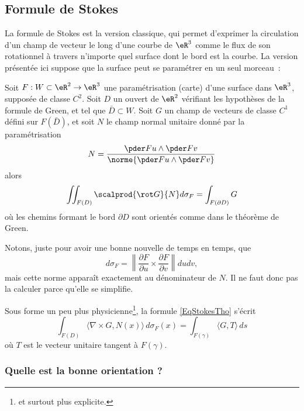 \subsection{Formule de Stokes}
\label{secstokesusuel}
La formule de Stokes est la version classique, qui permet d'exprimer la circulation d'un champ de vecteur le long d'une courbe de $\eR^3$ comme le flux de son rotationnel à travers n'importe quel surface dont le bord est la courbe. La version présentée ici suppose que la surface peut se paramétrer en un seul morceau~:
\begin{theorem}
  Soit $F : W\subset \eR^2 \to \eR^3$ une paramétrisation (carte) d'une surface dans $\eR^3$, supposée de classe $C^2$. Soit $D$ un ouvert de $\eR^2$ vérifiant les hypothèses de la formule de Green, et tel que $\bar D \subset W$. Soit $G$ un champ de vecteurs de classe $C^1$ défini sur $F(\bar D)$, et soit $N$ le champ normal unitaire donné par la paramétrisation
  \begin{equation}		
	N = \frac{\pder F u \wedge \pder F v}{\norme{\pder F u \wedge \pder F v}}
\end{equation}
  alors
  \begin{equation}\label{EqStokesTho}
    \iint_{F(D)} \scalprod{\rot G}{N} d\sigma_F = \int_{F(\partial D)} G
  \end{equation}
  où les chemins formant le bord $\partial D$ sont orientés comme dans le théorème de Green.
\end{theorem}
Notons, juste pour avoir une bonne nouvelle de temps en temps, que 
\begin{equation}
	d\sigma_F=\left\| \frac{ \partial F }{ \partial u }\times\frac{ \partial F }{ \partial v }  \right\|dudv,
\end{equation}
mais cette norme apparaît exactement au dénominateur de $N$. Il ne faut donc pas la calculer parce qu'elle se simplifie.

Sous forme un peu plus physicienne\footnote{et surtout plus explicite.}, la formule \eqref{EqStokesTho} s'écrit
\begin{equation}
	\int_{F(D)}\langle \nabla\times G, N(x)\rangle\, d\sigma_F(x)=\int_{F(\gamma)}\langle G, T\rangle\, ds
\end{equation}
où $T$ est le vecteur unitaire tangent à $F(\gamma)$.

\subsubsection{Quelle est la bonne orientation ?}

